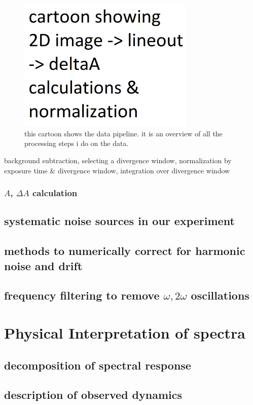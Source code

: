 \begin{figure}
	\centering
	\includegraphics[width=0.75\textwidth]{figures/chap4/data_pipeline.png}
	\caption{this cartoon shows the data pipeline. it is an overview of all the processing steps i do on the data.}
	\label{fig:data_pipeline}
\end{figure}

background subtraction, selecting a divergence window, normalization by exposure time \& divergence window, integration over divergence window




\subsubsection{$A$, $\Delta A$ calculation}

\subsection{systematic noise sources in our experiment}

\subsection{methods to numerically correct for harmonic noise and drift}

\subsection{frequency filtering to remove $\omega, 2 \omega$ oscillations}

\section{Physical Interpretation of spectra}
\subsection{decomposition of spectral response}
\subsection{description of observed dynamics}